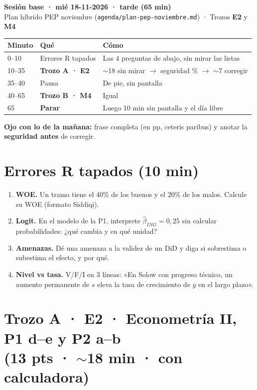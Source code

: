 \documentclass[11pt]{article}
\begin{document}
{\Large\textbf{Sesión base · mié 18-11-2026 · tarde (65 min)}}\\[2pt]
{\small Plan híbrido PEP noviembre (\texttt{agenda/plan-pep-noviembre.md}) · Trozos \textbf{E2} y \textbf{M4}}

\medskip
\begin{tabular}{@{}lll@{}}
\toprule
Minuto & Qué & Cómo \\ \midrule
0--10 & Errores R tapados & Las 4 preguntas de abajo, sin mirar las listas \\
10--35 & \textbf{Trozo A · E2} & $\sim$18 sin mirar $\to$ seguridad \% $\to$ $\sim$7 corregir \\
35--40 & Pausa & De pie, sin pantalla \\
40--65 & \textbf{Trozo B · M4} & Igual \\
65 & \textbf{Parar} & Luego 10 min sin pantalla y el día libre \\ \bottomrule
\end{tabular}

\smallskip
{\small \textbf{Ojo con lo de la mañana:} frase completa (en pp, ceteris paribus) y anotar la \textbf{seguridad antes} de corregir.}

\section*{Errores R tapados (10 min)}
\begin{enumerate}[label=\arabic*.,leftmargin=*,itemsep=3pt]
\item \textbf{WOE.} Un tramo tiene el 40\% de los buenos y el 20\% de los malos. Calcule su WOE (formato Siddiqi).
\item \textbf{Logit.} En el modelo de la P1, interprete $\hat\beta_{ING}=0{,}25$ sin calcular probabilidades: ¿qué cambia y en qué unidad?
\item \textbf{Amenazas.} Dé una amenaza a la validez de un DiD y diga si sobrestima o subestima el efecto, y por qué.
\item \textbf{Nivel vs tasa.} V/F/I en 3 líneas: «En Solow con progreso técnico, un aumento permanente de $s$ eleva la tasa de crecimiento de $y$ en el largo plazo».
\end{enumerate}

\section*{Trozo A · E2 · Econometría II, P1 d--e y P2 a--b\\ {\normalsize\mdseries (13 pts · $\sim$18 min · con calculadora)}}
\end{document}
